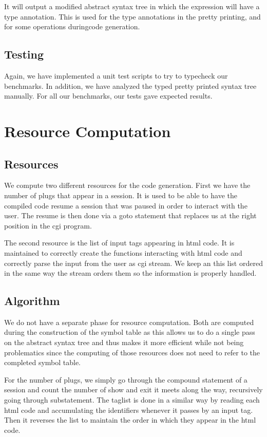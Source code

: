 \documentclass{WigReport}
\begin{document}
It will output a modified abstract syntax tree in which the expression will have a type annotation. This is used for the type annotations in the pretty printing, and for some operations duringcode generation. 


\subsection{Testing}
Again, we have implemented a unit test scripts to try to typecheck our benchmarks. In addition, we have analyzed the typed pretty printed syntax tree manually. For all our benchmarks, our tests gave expected results.

\section{Resource Computation}
\subsection{Resources}
We compute two different resources for the code generation. First we have the number of plugs that appear in a session. It is used to be able to have the compiled code resume a session that was paused in order to interact with the user. The resume is then done via a goto statement that replaces us at the right position in the cgi program.

The second resource is the list of input tags appearing in html code. It is maintained to correctly create the functions interacting with html code and correctly parse the input from the user as cgi stream. We keep an this list ordered in the same way the stream orders them so the information is properly handled.


\subsection{Algorithm}
We do not have a separate phase for resource computation. Both are computed during the construction of the symbol table as this allows us to do a single pass on the abstract syntax tree and thus makes it more efficient while not being problematics since the computing of those resources does not need to refer to the completed symbol table.

For the number of plugs, we simply go through the compound statement of a session and count the number of show and exit it meets along the way, recursively going through substatement. The taglist is done in a similar way by reading each html code and accumulating the identifiers whenever it passes by an input tag. Then it reverses the list to maintain the order in which they appear in the html code.
\end{document}
